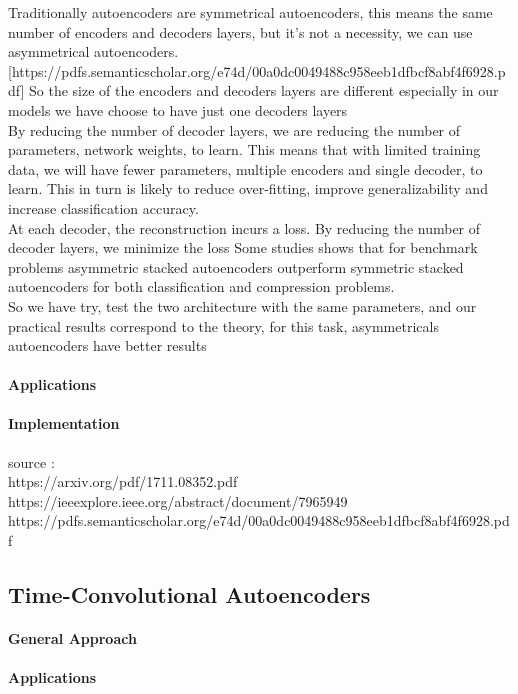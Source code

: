 \documentclass[11pt]{article}
\begin{document}
Traditionally autoencoders are symmetrical autoencoders, this means the same number of encoders and decoders layers, but it’s not a necessity, we can use asymmetrical autoencoders.
[https://pdfs.semanticscholar.org/e74d/00a0dc0049488c958eeb1dfbcf8abf4f6928.pdf]
So the size of the encoders and decoders layers are different especially in our models we have choose to have just one decoders layers\\
By reducing the number of decoder layers, we are reducing the number of parameters, network weights, to learn. This means that with limited training data, we will have fewer parameters, multiple encoders and single decoder, to learn. This in turn is likely to reduce over-fitting, improve generalizability and increase classification accuracy. \\
At each decoder, the reconstruction incurs a loss. By reducing the number of decoder layers, we minimize the loss
Some studies shows that for benchmark problems asymmetric stacked autoencoders outperform symmetric stacked autoencoders for both classification and compression problems. \\
So we have try, test the two architecture with the same parameters, and our practical results correspond to the theory, for this task, asymmetricals autoencoders have better results
  
\paragraph{Applications} 
\paragraph{Implementation} 

source : \\
https://arxiv.org/pdf/1711.08352.pdf \\
https://ieeexplore.ieee.org/abstract/document/7965949 \\
https://pdfs.semanticscholar.org/e74d/00a0dc0049488c958eeb1dfbcf8abf4f6928.pdf \\

\subsection{Time-Convolutional Autoencoders}
\paragraph{General Approach}
\paragraph{Applications}
\end{document}
